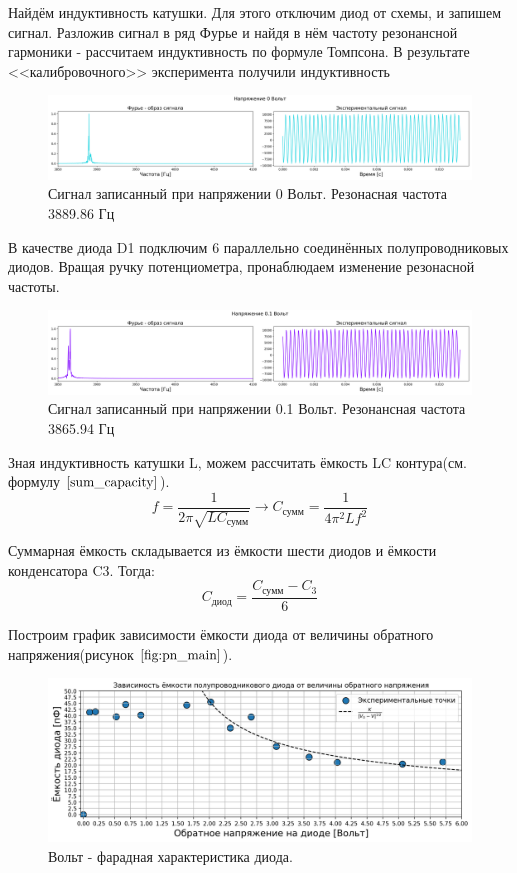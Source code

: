 \documentclass[a4paper, 12pt]{extarticle}
\begin{document}
Найдём индуктивность катушки. Для этого отключим диод от схемы, и запишем сигнал.
Разложив сигнал в ряд Фурье и найдя в нём частоту резонансной гармоники - рассчитаем 
индуктивность по формуле Томпсона. В результате <<калибровочного>> эксперимента получили индуктивность


\begin{figure}[htbp]
    \centering
    \includegraphics*[width = 1 \textwidth]{plots/0.png}
    \caption{Сигнал записанный при напряжении 0 Вольт. Резонасная частота 3889.86 Гц}
    \label{fig:zero_volt_specturm}
\end{figure}
В качестве диода D1 подключим 6 параллельно соединённых полупроводниковых диодов.
Вращая ручку потенциометра, пронаблюдаем изменение резонасной частоты.

\begin{figure}[htbp]
    \centering
    \includegraphics*[width = 1\textwidth]{plots/0.1.png}
    \caption{Сигнал записанный при напряжении 0.1 Вольт. Резонансная частота 3865.94 Гц}
    \label{<label>}
\end{figure}

Зная индуктивность катушки L, можем рассчитать ёмкость LC контура(см. формулу $\ref{sum_capacity}$).
\begin{equation}
    \label{sum_capacity}
    f = \frac{1}{2 \pi \sqrt{LC_{\text{сумм}}}} \to C_{\text{сумм}} = \frac{1}{4 \pi^2 L f^2}    
\end{equation}

Суммарная ёмкость складывается из ёмкости шести диодов и ёмкости конденсатора C3. Тогда:
\begin{equation}
    \label{diode_capacity}
    C_{\text{диод}} = \frac{C_{\text{сумм}} - C_{3}}{6}
\end{equation}

Построим график зависимости ёмкости диода от величины обратного напряжения(рисунок $\ref{fig:pn_main}$).
\begin{figure}[htbp]
    \centering
    \includegraphics*[width = 0.9 \textwidth]{plots/pn.png}
    \caption{Вольт - фарадная характеристика диода.}
    \label{fig:pn_main}
\end{figure}
\end{document}
